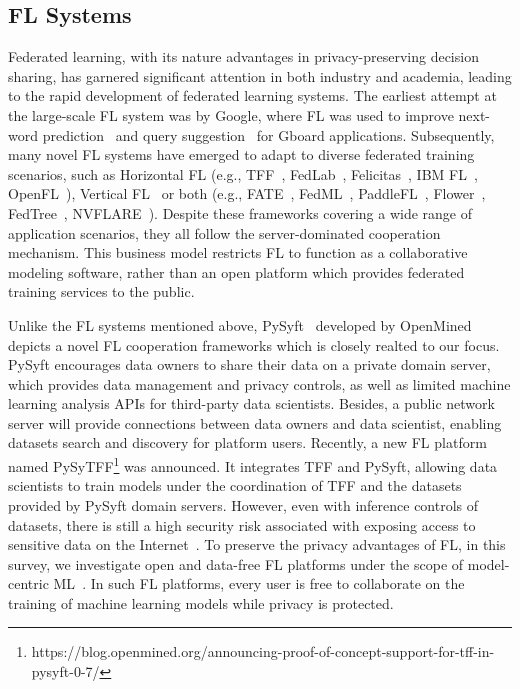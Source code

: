 \subsection{FL Systems}
\label{sec:flsystems}
Federated learning, with its nature advantages in privacy-preserving decision sharing, has garnered significant attention in both industry and academia, leading to the rapid development of federated learning systems.
The earliest attempt at the large-scale FL system was by Google, where FL was used to improve next-word prediction~\cite{hard2018federated} and query suggestion~\cite{yang2018applied} for Gboard applications.
Subsequently, many novel FL systems have emerged to adapt to diverse federated training scenarios, such as Horizontal FL (e.g., TFF~\cite{abadi2016tensorflow}, FedLab~\cite{zeng2023fedlab}, Felicitas~\cite{zhang2022felicitas}, IBM FL~\cite{ibmfl2020ibm}, OpenFL~\cite{foley2022openfl}), Vertical FL~\cite{wu2022practical} or both (e.g., FATE~\cite{liu2021fate}, FedML~\cite{he2020fedml}, PaddleFL~\cite{ma2019paddlepaddle}, Flower~\cite{beutel2020flower}, FedTree~\cite{li2023fedtree}, NVFLARE~\cite{roth2022nvidia}).
Despite these frameworks covering a wide range of application scenarios, they all follow the server-dominated cooperation mechanism.
This business model restricts FL to function as a collaborative modeling software, rather than an open platform which provides federated training services to the public.

Unlike the FL systems mentioned above, PySyft~\cite{ziller2021pysyft} developed by OpenMined depicts a novel FL cooperation frameworks which is closely realted to our focus. 
PySyft encourages data owners to share their data on a private domain server, which provides data management and privacy controls, as well as limited machine learning analysis APIs for third-party data scientists.
Besides, a public network server will provide connections between data owners and data scientist, enabling datasets search and discovery for platform users.
Recently, a new FL platform named PySyTFF\footnote{https://blog.openmined.org/announcing-proof-of-concept-support-for-tff-in-pysyft-0-7/} was announced. It integrates TFF and PySyft, allowing data scientists to train models under the coordination of TFF and the datasets provided by PySyft domain servers.
However, even with inference controls of datasets, there is still a high security risk associated with exposing access to sensitive data on the Internet~\cite{gamundani2018review}.
To preserve the privacy advantages of FL, in this survey, we investigate open and data-free FL platforms under the scope of model-centric ML~\cite{lou2020towards}.
In such FL platforms, every user is free to collaborate on the training of machine learning models while privacy is protected.

